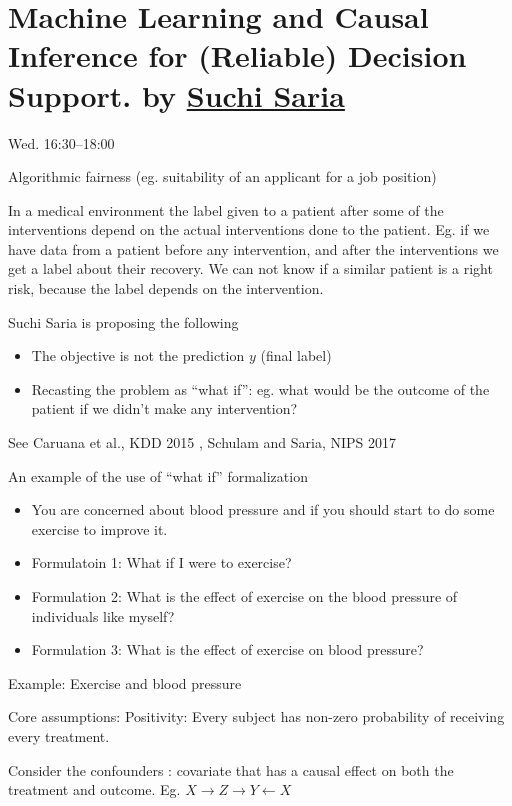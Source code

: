 \chapter{Machine Learning and Causal Inference for (Reliable) Decision Support.
by \href{https://suchisaria.jhu.edu/}{Suchi Saria}}

 Wed. 16:30--18:00

Algorithmic fairness (eg. suitability of an applicant for a job position)

In a medical environment the label given to a patient after some of the
interventions depend on the actual interventions done to the patient. Eg. if we
have data from a patient before any intervention, and after the interventions
we get a label about their recovery. We can not know if a similar patient is a
right risk, because the label depends on the intervention.

Suchi Saria is proposing the following

\begin{itemize}
  \item The objective is not the prediction $y$ (final label)
  \item Recasting the problem as ``what if'': eg. what would be the outcome of
    the patient if we didn't make any intervention?
\end{itemize}

See Caruana et al., KDD 2015 \cite{caruana2015intelligible}, Schulam and Saria,
NIPS 2017 \cite{schulam2017reliable}

An example of the use of ``what if'' formalization

\begin{itemize}
  \item You are concerned about blood pressure and if you should start to do
    some exercise to improve it.
  \item Formulatoin 1: What if I were to exercise?
  \item Formulation 2: What is the effect of exercise on the blood pressure of
    individuals like myself?
  \item Formulation 3: What is the effect of exercise on blood pressure?
\end{itemize}

Example: Exercise and blood pressure

Core assumptions: Positivity: Every subject has non-zero probability of
receiving every treatment.

Consider the confounders : covariate that has a causal effect on both the
treatment and outcome. Eg. $X \to Z \to Y \leftarrow X$

